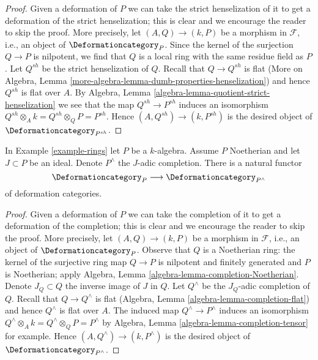 \begin{proof}
Given a deformation of $P$ we can take the strict henselization
of it to get a deformation of the strict henselization; this is
clear and we encourage the reader to skip the proof. More precisely,
let $(A, Q) \to (k, P)$ be a morphism in $\mathcal{F}$, i.e.,
an object of $\Deformationcategory_P$. Since the kernel of the surjection
$Q \to P$ is nilpotent, we find that $Q$ is a local ring with the
same residue field as $P$. Let $Q^{sh}$ be the strict henselization
of $Q$. Recall that $Q \to Q^{sh}$ is flat
(More on Algebra, Lemma \ref{more-algebra-lemma-dumb-properties-henselization})
and hence $Q^{sh}$ is flat over $A$.
By Algebra, Lemma \ref{algebra-lemma-quotient-strict-henselization}
we see that the map $Q^{sh} \to P^{sh}$ induces an isomorphism
$Q^{sh} \otimes_A k = Q^{sh} \otimes_Q P = P^{sh}$.
Hence $(A, Q^{sh}) \to (k, P^{sh})$ is the desired object of
$\Deformationcategory_{P^{sh}}$.
\end{proof}

\begin{lemma}
\label{lemma-completion}
In Example \ref{example-rings} let $P$ be a $k$-algebra.
Assume $P$ Noetherian and let $J \subset P$ be an ideal.
Denote $P^\wedge$ the $J$-adic completion.
There is a natural functor
$$
\Deformationcategory_P \longrightarrow \Deformationcategory_{P^\wedge}
$$
of deformation categories.
\end{lemma}

\begin{proof}
Given a deformation of $P$ we can take the completion
of it to get a deformation of the completion; this is
clear and we encourage the reader to skip the proof. More precisely,
let $(A, Q) \to (k, P)$ be a morphism in $\mathcal{F}$, i.e.,
an object of $\Deformationcategory_P$. Observe that $Q$ is a Noetherian
ring: the kernel of the surjective ring map $Q \to P$ is
nilpotent and finitely generated and $P$ is Noetherian; apply
Algebra, Lemma \ref{algebra-lemma-completion-Noetherian}.
Denote $J_Q \subset Q$ the inverse
image of $J$ in $Q$. Let $Q^\wedge$ be the $J_Q$-adic completion of $Q$.
Recall that $Q \to Q^\wedge$ is flat
(Algebra, Lemma \ref{algebra-lemma-completion-flat})
and hence $Q^\wedge$ is flat over $A$.
The induced map $Q^\wedge \to P^\wedge$ induces an isomorphism
$Q^\wedge \otimes_A k = Q^\wedge \otimes_Q P = P^\wedge$ by
Algebra, Lemma \ref{algebra-lemma-completion-tensor} for example.
Hence $(A, Q^\wedge) \to (k, P^\wedge)$
is the desired object of $\Deformationcategory_{P^\wedge}$.
\end{proof}

